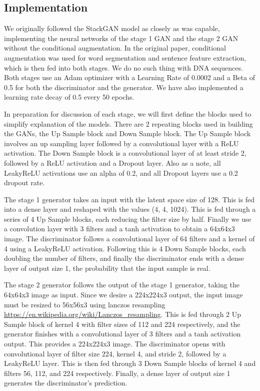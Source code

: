 \documentclass{article}
\begin{document}
	\subsection{Implementation}
	We originally followed the StackGAN model as closely as was capable, implementing the neural networks of the stage 1 GAN and the stage 2 GAN without the conditional augmentation. In the original paper, conditional augmentation was used for word segmentation and sentence feature extraction, which is then fed into both stages. We do no such thing with DNA sequences. Both stages use an Adam optimizer with a Learning Rate of 0.0002 and a Beta of 0.5 for both the discriminator and the generator. We have also implemented a learning rate decay of 0.5 every 50 epochs.

	In preparation for discussion of each stage, we will first define the blocks used to simplify explanation of the models. There are 2 repeating blocks used in building the GANs, the Up Sample block and Down Sample block. The Up Sample block involves an up sampling layer followed by a convolutional layer with a ReLU activation. The Down Sample block is a convolutional layer of at least stride 2, followed by a ReLU activation and a Dropout layer. Also as a note, all LeakyReLU activations use an alpha of 0.2, and all Dropout layers use a 0.2 dropout rate.

	The stage 1 generator takes an input with the latent space size of 128. This is fed into a dense layer and reshaped with the values (4, 4, 1024). This is fed through a series of 4 Up Sample blocks, each reducing the filter size by half. Finally we use a convolution layer with 3 filters and a tanh activation to obtain a 64x64x3 image. The discriminator follows a convolutional layer of 64 filters and a kernel of 4 using a LeakyReLU activation. Following this is 4 Down Sample blocks, each doubling the number of filters, and finally the discriminator ends with a dense layer of output size 1, the probability that the input sample is real.

	The stage 2 generator follows the output of the stage 1 generator, taking the 64x64x3 image as input. Since we desire a 224x224x3 output, the input image must be resized to 56x56x3 using lanczos resampling \url{https://en.wikipedia.org/wiki/Lanczos_resampling}. This is fed through 2 Up Sample block of kernel 4 with filter sizes of 112 and 224 respectively, and the generator finishes with a convolutional layer of 3 filters  and a tanh activation output. This provides a 224x224x3 image. The discriminator opens with convolutional layer of filter size 224, kernel 4, and stride 2, followed by a LeakyReLU layer. This is then fed through 3 Down Sample blocks of kernel 4 and filters 56, 112, and 224 respectively. Finally, a dense layer of output size 1 generates the discriminator’s prediction.
\end{document}
